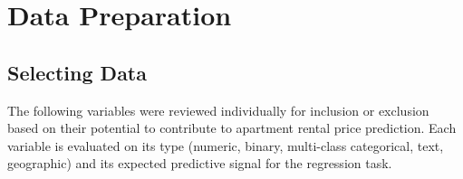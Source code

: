 \section{Data Preparation}


\subsection{Selecting Data}
\label{subsec:Selecting Data}
\noindent
The following variables were reviewed individually for inclusion or exclusion based on their potential to contribute to apartment rental price prediction. Each variable is evaluated on its type (numeric, binary, multi-class categorical, text, geographic) and its expected predictive signal for the regression task.

